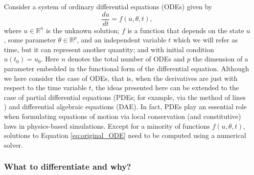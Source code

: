 Consider a system of ordinary differential equations (ODEs) given by
\begin{equation}
 \frac{du}{dt} = f(u, \theta, t),
 \label{eq:original_ODE}
\end{equation}
where $u \in \mathbb{R}^n$ is the unknown solution; $f$ is a function that depends on the state $u$, some parameter $\theta \in \mathbb R^p$, and an independent variable $t$ which we will refer as time, but it can represent another quantity; and with initial condition $u(t_0) = u_0$.
Here $n$ denotes the total number of ODEs and $p$ the dimension of a parameter embedded in the functional form of the differential equation.
Although we here consider the case of ODEs, that is, when the derivatives are just with respect to the time variable $t$, the ideas presented here can be extended to the case of partial differential equations (PDEs; for example, via the method of lines \cite{ascher2008numerical}) and differential algebraic equations (DAE).
In fact, PDEs play an essential role when formulating equations of motion via local conservation (and constitutive) laws in physics-based simulations.
Except for a minority of functions $f(u,\theta, t)$, solutions to Equation \eqref{eq:original_ODE} need to be computed using a numerical solver. 

\subsubsection{What to differentiate and why?}

